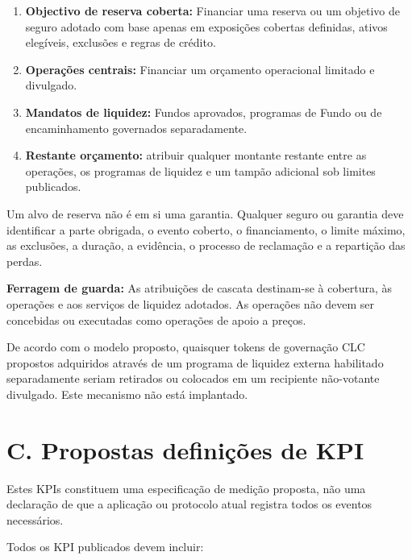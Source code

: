 \documentclass[11pt]{article}
\begin{document}
\begin{enumerate}[leftmargin=*]
\item \textbf{Objectivo de reserva coberta:} Financiar uma reserva ou um objetivo de seguro adotado com base apenas em exposições cobertas definidas, ativos elegíveis, exclusões e regras de crédito.
\item \textbf{Operações centrais:} Financiar um orçamento operacional limitado e divulgado.
\item \textbf{Mandatos de liquidez:} Fundos aprovados, programas de Fundo ou de encaminhamento governados separadamente.
\item \textbf{Restante orçamento:} atribuir qualquer montante restante entre as operações, os programas de liquidez e um tampão adicional sob limites publicados.
\end{enumerate}
Um alvo de reserva não é em si uma garantia. Qualquer seguro ou garantia deve identificar a parte obrigada, o evento coberto, o financiamento, o limite máximo, as exclusões, a duração, a evidência, o processo de reclamação e a repartição das perdas.

\textbf{Ferragem de guarda:} As atribuições de cascata destinam-se à cobertura, às operações e aos serviços de liquidez adotados. As operações não devem ser concebidas ou executadas como operações de apoio a preços.

De acordo com o modelo proposto, quaisquer tokens de governação CLC propostos adquiridos através de um programa de liquidez externa habilitado separadamente seriam retirados ou colocados em um recipiente não-votante divulgado. Este mecanismo não está implantado.


\section*{C. Propostas definições de KPI}

Estes KPIs constituem uma especificação de medição proposta, não uma declaração de que a aplicação ou protocolo atual registra todos os eventos necessários.

Todos os KPI publicados devem incluir:
\end{document}

